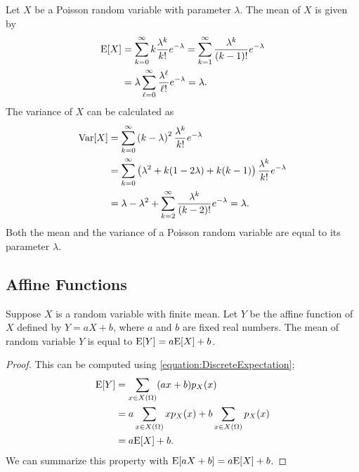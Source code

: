 \begin{example} \label{example:PoissonMeanVariance}
Let $X$ be a Poisson random variable with parameter $\lambda$.
The mean of $X$ is given by
\begin{equation*}
\begin{split}
\mathrm{E} [X] &= \sum_{k=0}^{\infty} k \frac{\lambda^k}{k!} e^{- \lambda}
= \sum_{k=1}^{\infty} \frac{\lambda^k}{(k-1)!} e^{- \lambda} \\
&= \lambda \sum_{\ell=0}^{\infty} \frac{\lambda^\ell}{\ell!} e^{- \lambda}
= \lambda .
\end{split}
\end{equation*}
The variance of $X$ can be calculated as
\begin{equation*}
\begin{split}
\mathrm{Var} [X] &= \sum_{k=0}^{\infty} \left( k - \lambda \right)^2
\frac{\lambda^k}{k!} e^{- \lambda} \\
&= \sum_{k=0}^{\infty} \left(\lambda^2 + k (1 - 2 \lambda) + k(k-1) \right)
\frac{\lambda^k}{k!} e^{- \lambda} \\
&= \lambda - \lambda^2
+ \sum_{k=2}^{\infty} \frac{\lambda^k}{(k-2)!} e^{- \lambda}
= \lambda .
\end{split}
\end{equation*}
Both the mean and the variance of a Poisson random variable are equal to its parameter $\lambda$.
\end{example}


\subsection{Affine Functions}

\begin{proposition}
Suppose $X$ is a random variable with finite mean.
Let $Y$ be the affine function of $X$ defined by $Y = aX + b$, where $a$ and $b$ are fixed real numbers.
The mean of random variable $Y$ is equal to $\mathrm{E} [Y] = a \mathrm{E} [X] + b$.
\end{proposition}
\begin{proof}
This can be computed using \eqref{equation:DiscreteExpectation};
\begin{equation*}
\begin{split}
\mathrm{E} [Y] &= \sum_{x \in X(\Omega)} (ax + b) p_X(x) \\
&= a \sum_{x \in X(\Omega)} x p_X(x) + b \sum_{x \in X(\Omega)} p_X(x) \\
&= a \mathrm{E} [X] + b.
\end{split}
\end{equation*}
We can summarize this property with $\mathrm{E} [a X + b] = a \mathrm{E} [X] + b$.
\end{proof}

